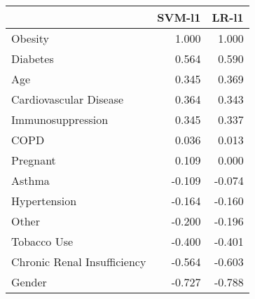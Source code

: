 \begin{tabular}{lrr}
\toprule
{} &  SVM-l1 &  LR-l1 \\
\midrule
Obesity                     &   1.000 &  1.000 \\
Diabetes                    &   0.564 &  0.590 \\
Age                         &   0.345 &  0.369 \\
Cardiovascular Disease      &   0.364 &  0.343 \\
Immunosuppression           &   0.345 &  0.337 \\
COPD                        &   0.036 &  0.013 \\
Pregnant                    &   0.109 &  0.000 \\
Asthma                      &  -0.109 & -0.074 \\
Hypertension                &  -0.164 & -0.160 \\
Other                       &  -0.200 & -0.196 \\
Tobacco Use                 &  -0.400 & -0.401 \\
Chronic Renal Insufficiency &  -0.564 & -0.603 \\
Gender                      &  -0.727 & -0.788 \\
\bottomrule
\end{tabular}

